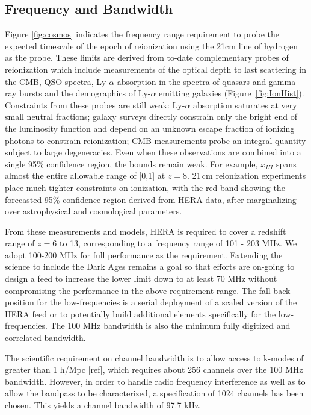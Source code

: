 \documentclass[preprint,11pt]{aastex}
\begin{document}
\subsection{Frequency and Bandwidth}
Figure \ref{fig:cosmos} indicates the frequency range requirement to probe the expected timescale of the epoch of reionization using the 21cm line of hydrogen as the probe.  
These limits are derived from to-date complementary probes of reionization which include measurements of
the optical depth to last scattering in the CMB, QSO spectra, Ly-$\alpha$
absorption in the spectra of quasars and gamma ray bursts and the demographics
of Ly-$\alpha$ emitting galaxies
(Figure~\ref{fig:IonHist}). 
Constraints from these probes are still weak:
Ly-$\alpha$ absorption saturates at very small neutral fractions; galaxy
surveys directly constrain only the bright end of the luminosity function and
depend on an unknown escape fraction of ionizing photons to constrain
reionization; CMB measurements probe an integral quantity subject
to large degeneracies. Even when these observations are
combined into a single 95\% confidence region, the bounds remain weak.
For example, $x_{HI}$ spans almost the entire allowable range of [0,1]
at $z=8$. 21\,cm reionization experiments place much tighter constraints on ionization, with the
red band showing the forecasted 95\% confidence region derived from HERA data,
after marginalizing over astrophysical and cosmological parameters.


From these measurements and models, HERA is required to cover a redshift range of $z=$6 to 13, corresponding to a frequency range of 101 - 203 MHz.  We adopt 100-200 MHz for full performance as the requirement.  Extending the science to include the Dark Ages remains a goal so that efforts are on-going to design a feed to increase the lower limit down to at least 70 MHz without compromising the performance in the above requirement range.  The fall-back position for the low-frequencies is a serial deployment of a scaled version of the HERA feed or to potentially build additional elements specifically for the low-frequencies.  The 100 MHz bandwidth is also the minimum fully digitized and correlated bandwidth.

The scientific requirement on channel bandwidth is to allow access to k-modes of greater than 1 h/Mpc [ref], which requires about 256 channels over the 100 MHz bandwidth.  However, in order to handle radio frequency interference as well as to allow the bandpass to be characterized, a specification of 1024 channels has been chosen.  This yields a channel bandwidth of 97.7 kHz.
\end{document}
